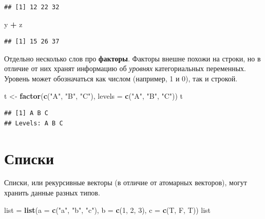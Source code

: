 \documentclass[
]{book}
\newenvironment{Shaded}{\begin{snugshade}}{\end{snugshade}}
\newcommand{\AttributeTok}[1]{\textcolor[rgb]{0.13,0.29,0.53}{#1}}
\newcommand{\DecValTok}[1]{\textcolor[rgb]{0.00,0.00,0.81}{#1}}
\newcommand{\FunctionTok}[1]{\textcolor[rgb]{0.13,0.29,0.53}{\textbf{#1}}}
\newcommand{\NormalTok}[1]{#1}
\newcommand{\OtherTok}[1]{\textcolor[rgb]{0.56,0.35,0.01}{#1}}
\newcommand{\SpecialCharTok}[1]{\textcolor[rgb]{0.81,0.36,0.00}{\textbf{#1}}}
\newcommand{\StringTok}[1]{\textcolor[rgb]{0.31,0.60,0.02}{#1}}
\theoremstyle{definition}
\theoremstyle{definition}
\theoremstyle{definition}
\theoremstyle{definition}
\theoremstyle{remark}
\begin{document}
\begin{verbatim}
## [1] 12 22 32
\end{verbatim}

\begin{Shaded}
\begin{Highlighting}[]
\NormalTok{y }\SpecialCharTok{+}\NormalTok{ z}
\end{Highlighting}
\end{Shaded}

\begin{verbatim}
## [1] 15 26 37
\end{verbatim}

Отдельно несколько слов про \textbf{факторы}. Факторы внешне похожи на строки, но в отличие от них хранят информацию об \emph{уровнях} категориальных переменных. Уровень может обозначаться как числом (например, 1 и 0), так и строкой.

\begin{Shaded}
\begin{Highlighting}[]
\NormalTok{t }\OtherTok{\textless{}{-}} \FunctionTok{factor}\NormalTok{(}\FunctionTok{c}\NormalTok{(}\StringTok{"A"}\NormalTok{, }\StringTok{"B"}\NormalTok{, }\StringTok{"C"}\NormalTok{), }\AttributeTok{levels =} \FunctionTok{c}\NormalTok{(}\StringTok{"A"}\NormalTok{, }\StringTok{"B"}\NormalTok{, }\StringTok{"C"}\NormalTok{))}
\NormalTok{t}
\end{Highlighting}
\end{Shaded}

\begin{verbatim}
## [1] A B C
## Levels: A B C
\end{verbatim}

\hypertarget{ux441ux43fux438ux441ux43aux438}{%
\section{Списки}\label{ux441ux43fux438ux441ux43aux438}}

Списки, или рекурсивные векторы (в отличие от атомарных векторов), могут хранить данные разных типов.

\begin{Shaded}
\begin{Highlighting}[]
\NormalTok{list }\OtherTok{=} \FunctionTok{list}\NormalTok{(}\AttributeTok{a =} \FunctionTok{c}\NormalTok{(}\StringTok{"a"}\NormalTok{, }\StringTok{"b"}\NormalTok{, }\StringTok{"c"}\NormalTok{), }\AttributeTok{b =} \FunctionTok{c}\NormalTok{(}\DecValTok{1}\NormalTok{, }\DecValTok{2}\NormalTok{, }\DecValTok{3}\NormalTok{), }\AttributeTok{c =} \FunctionTok{c}\NormalTok{(T, F, T))}
\NormalTok{list}
\end{Highlighting}
\end{Shaded}
\end{document}
